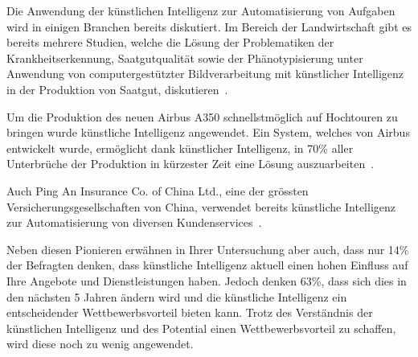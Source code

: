 \documentclass{hwz}
\begin{document}


Die Anwendung der künstlichen Intelligenz zur Automatisierung von Aufgaben wird in einigen Branchen bereits diskutiert. Im Bereich der Landwirtschaft gibt es bereits mehrere Studien, welche die Lösung der Problematiken der Krankheitserkennung, Saatgutqualität sowie der Phänotypisierung unter Anwendung von computergestützter Bildverarbeitung mit künstlicher Intelligenz in der Produktion von Saatgut, diskutieren~\autocite{Patricio2018ComputerReview}. 

Um die Produktion des neuen Airbus A350 schnellstmöglich auf Hochtouren zu bringen wurde künstliche Intelligenz angewendet. Ein System, welches von Airbus entwickelt wurde, ermöglicht dank künstlicher Intelligenz, in 70\% aller Unterbrüche der Produktion in kürzester Zeit eine Lösung auszuarbeiten~\autocite{Ransbotham2017ReshapingIntelligence}.

Auch Ping An Insurance Co. of China Ltd., eine der grössten Versicherungsgesellschaften von China, verwendet bereits künstliche Intelligenz zur Automatisierung von diversen Kundenservices~\autocite{Ransbotham2017ReshapingIntelligence}.

Neben diesen Pionieren erwähnen \textcite{Ransbotham2017ReshapingIntelligence} in Ihrer Untersuchung aber auch, dass nur 14\% der Befragten denken, dass künstliche Intelligenz aktuell einen hohen Einfluss auf Ihre Angebote und Dienstleistungen haben. Jedoch denken 63\%, dass sich dies in den nächsten 5 Jahren ändern wird und die künstliche Intelligenz ein entscheidender Wettbewerbsvorteil bieten kann. Trotz des Verständnis der künstlichen Intelligenz und des Potential einen Wettbewerbsvorteil zu schaffen, wird diese noch zu wenig angewendet\autocite{Ransbotham2017ReshapingIntelligence}.
\end{document}
